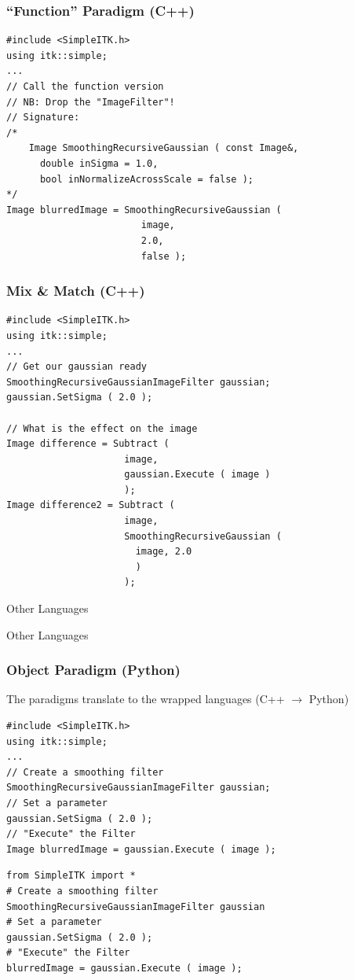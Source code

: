 \begin{frame}[fragile]
\frametitle{``Function'' Paradigm (C++)}
\lstcpp
\begin{lstlisting}
#include <SimpleITK.h>
using itk::simple;
...
// Call the function version
// NB: Drop the "ImageFilter"!
// Signature:
/*
    Image SmoothingRecursiveGaussian ( const Image&,
      double inSigma = 1.0,
      bool inNormalizeAcrossScale = false );
*/
Image blurredImage = SmoothingRecursiveGaussian (
                        image,
                        2.0,
                        false );
\end{lstlisting}
\end{frame}

\begin{frame}[fragile]
\frametitle{Mix \& Match (C++)}
\lstcpp
\begin{lstlisting}
#include <SimpleITK.h>
using itk::simple;
...
// Get our gaussian ready
SmoothingRecursiveGaussianImageFilter gaussian;
gaussian.SetSigma ( 2.0 );

// What is the effect on the image
Image difference = Subtract (
                     image,
                     gaussian.Execute ( image )
                     );
Image difference2 = Subtract (
                     image,
                     SmoothingRecursiveGaussian (
                       image, 2.0
                       )
                     );

\end{lstlisting}
\end{frame}


\begin{frame}{Other Languages}
\fontsize{36pt}{36pt}\selectfont
\center
\begin{center}
Other Languages
\end{center}
\end{frame}

\begin{frame}[fragile]
\frametitle{Object Paradigm (Python)}
The paradigms translate to the wrapped languages (C++ $\rightarrow$ Python)
\lstcpp
\begin{lstlisting}
#include <SimpleITK.h>
using itk::simple;
...
// Create a smoothing filter
SmoothingRecursiveGaussianImageFilter gaussian;
// Set a parameter
gaussian.SetSigma ( 2.0 );
// "Execute" the Filter
Image blurredImage = gaussian.Execute ( image );
\end{lstlisting}
\lstpython
\begin{lstlisting}
from SimpleITK import *
# Create a smoothing filter
SmoothingRecursiveGaussianImageFilter gaussian
# Set a parameter
gaussian.SetSigma ( 2.0 );
# "Execute" the Filter
blurredImage = gaussian.Execute ( image );
\end{lstlisting}
\end{frame}


